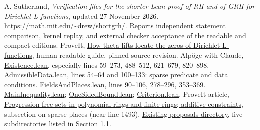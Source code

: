 \documentclass[11pt]{article}
\theoremstyle{remark}\newtheorem{remark}[theorem]{Remark}
\newcommand{\baseurl}{https://github.com/VladimirReshetnikov/ProveIt/blob/89d12dd40424f1217fd818d84877b3da52396a3b/Analysis/GeneralizedRiemannHypothesis/}
\newcommand{\srcurl}[2]{\href{\baseurl#1}{#2}}
\begin{document}
\begin{thebibliography}{9}\small
{} A. Sutherland, \emph{Verification files for the shorter Lean proof of RH and of GRH for Dirichlet L-functions}, updated 27 November 2026. \url{https://math.mit.edu/~drew/shortgrh/}. Reports independent statement comparison, kernel replay, and external checker acceptance of the readable and compact editions.
 ProveIt, \srcurl{docs/guide/theta_lifts_and_dirichlet_zeros.tex}{How theta lifts locate the zeros of Dirichlet L-functions}, human-readable guide, pinned source revision.
 Alp\"oge with Claude, \srcurl{Lean/grh/src/New/Reduction/Data/Existence.lean}{Existence.lean}, especially lines 59--273, 488--512, 621--679, 820--898.
 \srcurl{Lean/grh/src/New/Reduction/Data/AdmissibleData.lean}{AdmissibleData.lean}, lines 54--64 and 100--133: sparse predicate and data conditions.
 \srcurl{Lean/grh/src/New/Reduction/Data/FieldsAndPlaces.lean}{FieldsAndPlaces.lean}, lines 90--106, 278--296, 353--369.
 \srcurl{Lean/grh/src/New/Reduction/MainInequality.lean}{MainInequality.lean}; \srcurl{Lean/grh/src/New/Reduction/OneSidedBound.lean}{OneSidedBound.lean}; \srcurl{Lean/grh/src/New/Reduction/Zeros/Criterion.lean}{Criterion.lean}.
 ProveIt article, \srcurl{Article/sections/gpp.tex}{Progression-free sets in polynomial rings and finite rings; additive constraints}, subsection on sparse places (near line 1493).
 \href{https://github.com/VladimirReshetnikov/ProveIt/tree/89d12dd40424f1217fd818d84877b3da52396a3b/Analysis/GeneralizedRiemannHypothesis/docs/proposals}{Existing proposals directory}, five subdirectories listed in Section 1.1.
\end{thebibliography}
\end{document}
